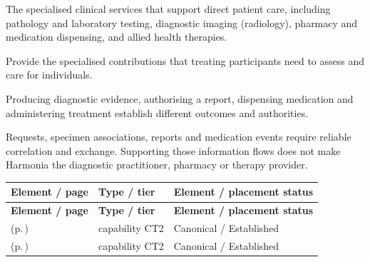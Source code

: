 
The specialised clinical services that support direct patient care, including pathology and laboratory testing, diagnostic imaging (radiology), pharmacy and medication dispensing, and allied health therapies.



Provide the specialised contributions that treating participants need to assess and care for individuals.



Producing diagnostic evidence, authorising a report, dispensing medication and administering treatment establish different outcomes and authorities.



Requests, specimen associations, reports and medication events require reliable correlation and exchange. Supporting those information flows does not make Harmonia the diagnostic practitioner, pharmacy or therapy provider.


\begingroup\small\setlength{\TableWidth}{\dimexpr\linewidth-6\tabcolsep-4\arrayrulewidth\relax}
\begin{longtable}{|>{\raggedright\arraybackslash}p{0.52\TableWidth}|>{\raggedright\arraybackslash}p{0.2\TableWidth}|>{\raggedright\arraybackslash}p{0.28\TableWidth}|}
\hline\rowcolor{TableHead}\textbf{Element / page} & \textbf{Type / tier} & \textbf{Element / placement status}\\\hline\endfirsthead
\hline\rowcolor{TableHead}\textbf{Element / page} & \textbf{Type / tier} & \textbf{Element / placement status}\\\hline\endhead
\hline\endfoot
\nameref{cap:bc-diagnostic-support-provision} (p.\,\pageref{cap:bc-diagnostic-support-provision}) & capability CT2 & Canonical / Established\\\hline
\nameref{cap:bc-medication-pharmacy-services} (p.\,\pageref{cap:bc-medication-pharmacy-services}) & capability CT2 & Canonical / Established\\\hline
\end{longtable}\endgroup

